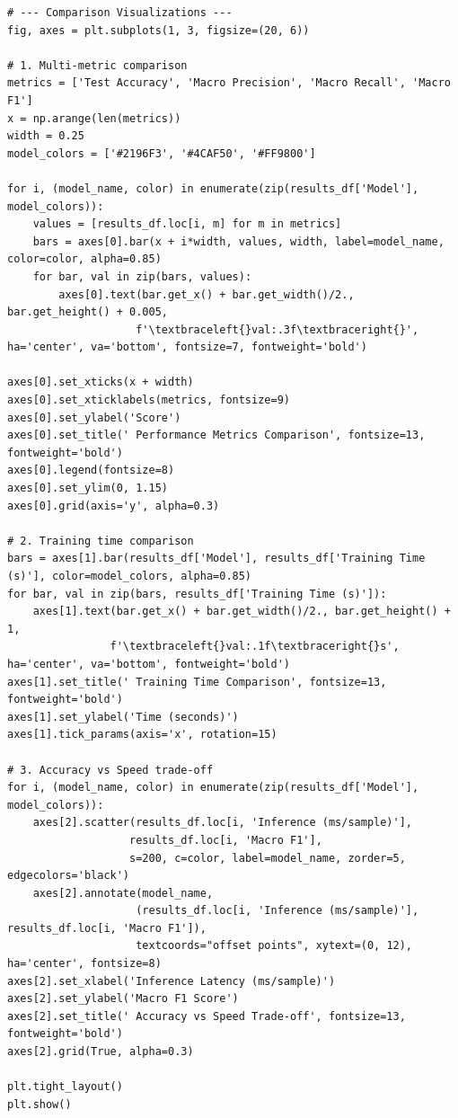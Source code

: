 \documentclass[12pt,a4paper,oneside]{report}
\begin{document}
\begin{Verbatim}[commandchars=\\\{\},breaklines=true,breakanywhere=true,fontsize=\scriptsize,frame=leftline,framesep=2mm,rulecolor=\color{gray}]
# --- Comparison Visualizations ---
fig, axes = plt.subplots(1, 3, figsize=(20, 6))

# 1. Multi-metric comparison
metrics = ['Test Accuracy', 'Macro Precision', 'Macro Recall', 'Macro F1']
x = np.arange(len(metrics))
width = 0.25
model_colors = ['#2196F3', '#4CAF50', '#FF9800']

for i, (model_name, color) in enumerate(zip(results_df['Model'], model_colors)):
    values = [results_df.loc[i, m] for m in metrics]
    bars = axes[0].bar(x + i*width, values, width, label=model_name, color=color, alpha=0.85)
    for bar, val in zip(bars, values):
        axes[0].text(bar.get_x() + bar.get_width()/2., bar.get_height() + 0.005,
                    f'\textbraceleft{}val:.3f\textbraceright{}', ha='center', va='bottom', fontsize=7, fontweight='bold')

axes[0].set_xticks(x + width)
axes[0].set_xticklabels(metrics, fontsize=9)
axes[0].set_ylabel('Score')
axes[0].set_title(' Performance Metrics Comparison', fontsize=13, fontweight='bold')
axes[0].legend(fontsize=8)
axes[0].set_ylim(0, 1.15)
axes[0].grid(axis='y', alpha=0.3)

# 2. Training time comparison
bars = axes[1].bar(results_df['Model'], results_df['Training Time (s)'], color=model_colors, alpha=0.85)
for bar, val in zip(bars, results_df['Training Time (s)']):
    axes[1].text(bar.get_x() + bar.get_width()/2., bar.get_height() + 1,
                f'\textbraceleft{}val:.1f\textbraceright{}s', ha='center', va='bottom', fontweight='bold')
axes[1].set_title(' Training Time Comparison', fontsize=13, fontweight='bold')
axes[1].set_ylabel('Time (seconds)')
axes[1].tick_params(axis='x', rotation=15)

# 3. Accuracy vs Speed trade-off
for i, (model_name, color) in enumerate(zip(results_df['Model'], model_colors)):
    axes[2].scatter(results_df.loc[i, 'Inference (ms/sample)'],
                   results_df.loc[i, 'Macro F1'],
                   s=200, c=color, label=model_name, zorder=5, edgecolors='black')
    axes[2].annotate(model_name,
                    (results_df.loc[i, 'Inference (ms/sample)'], results_df.loc[i, 'Macro F1']),
                    textcoords="offset points", xytext=(0, 12), ha='center', fontsize=8)
axes[2].set_xlabel('Inference Latency (ms/sample)')
axes[2].set_ylabel('Macro F1 Score')
axes[2].set_title(' Accuracy vs Speed Trade-off', fontsize=13, fontweight='bold')
axes[2].grid(True, alpha=0.3)

plt.tight_layout()
plt.show()
\end{Verbatim}
\end{document}
